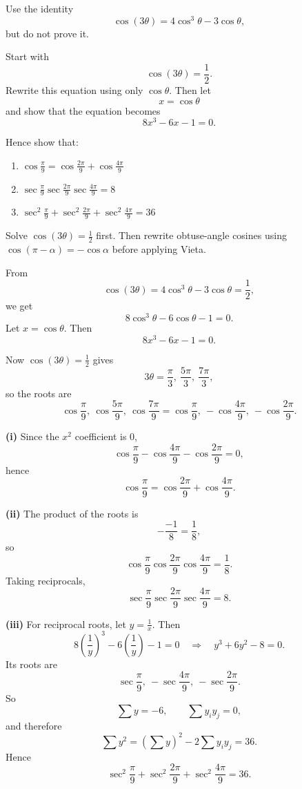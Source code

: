 \begin{problem}
Use the identity
\[
\cos(3\theta)=4\cos^3\theta-3\cos\theta,
\]
but do not prove it.

Start with
\[
\cos(3\theta)=\frac12.
\]
Rewrite this equation using only $\cos\theta$. Then let
\[
x=\cos\theta
\]
and show that the equation becomes
\[
8x^3-6x-1=0.
\]

Hence show that:
\begin{enumerate}[label=(\roman*)]
\item $\cos\frac{\pi}{9}=\cos\frac{2\pi}{9}+\cos\frac{4\pi}{9}$
\item $\sec\frac{\pi}{9}\sec\frac{2\pi}{9}\sec\frac{4\pi}{9}=8$
\item $\sec^2\frac{\pi}{9}+\sec^2\frac{2\pi}{9}+\sec^2\frac{4\pi}{9}=36$
\end{enumerate}
\end{problem}

\begin{hintbox}
Solve $\cos(3\theta)=\frac12$ first. Then rewrite obtuse-angle cosines using $\cos(\pi-\alpha)=-\cos\alpha$ before applying Vieta.
\end{hintbox}

\begin{solution}
From
\[
\cos(3\theta)=4\cos^3\theta-3\cos\theta=\frac12,
\]
we get
\[
8\cos^3\theta-6\cos\theta-1=0.
\]
Let $x=\cos\theta$. Then
\[
\boxed{8x^3-6x-1=0.}
\]

Now $\cos(3\theta)=\frac12$ gives
\[
3\theta=\frac{\pi}{3},\ \frac{5\pi}{3},\ \frac{7\pi}{3},
\]
so the roots are
\[
\cos\frac{\pi}{9},\ \cos\frac{5\pi}{9},\ \cos\frac{7\pi}{9}
=\cos\frac{\pi}{9},\ -\cos\frac{4\pi}{9},\ -\cos\frac{2\pi}{9}.
\]

\textbf{(i)} Since the $x^2$ coefficient is $0$,
\[
\cos\frac{\pi}{9}-\cos\frac{4\pi}{9}-\cos\frac{2\pi}{9}=0,
\]
hence
\[
\boxed{\cos\frac{\pi}{9}=\cos\frac{2\pi}{9}+\cos\frac{4\pi}{9}.}
\]

\textbf{(ii)} The product of the roots is
\[
-\frac{-1}{8}=\frac18,
\]
so
\[
\cos\frac{\pi}{9}\cos\frac{2\pi}{9}\cos\frac{4\pi}{9}=\frac18.
\]
Taking reciprocals,
\[
\boxed{\sec\frac{\pi}{9}\sec\frac{2\pi}{9}\sec\frac{4\pi}{9}=8.}
\]

\textbf{(iii)} For reciprocal roots, let $y=\frac1x$. Then
\[
8\left(\frac1y\right)^3-6\left(\frac1y\right)-1=0
\quad\Rightarrow\quad
y^3+6y^2-8=0.
\]
Its roots are
\[
\sec\frac{\pi}{9},\ -\sec\frac{4\pi}{9},\ -\sec\frac{2\pi}{9}.
\]
So
\[
\sum y=-6,\qquad \sum y_iy_j=0,
\]
and therefore
\[
\sum y^2=(\sum y)^2-2\sum y_iy_j=36.
\]
Hence
\[
\boxed{\sec^2\frac{\pi}{9}+\sec^2\frac{2\pi}{9}+\sec^2\frac{4\pi}{9}=36.}
\]
\end{solution}

